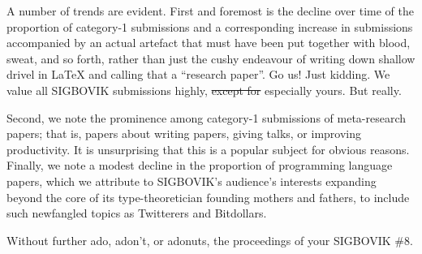 \documentclass[12pt]{article}
\begin{document}
A number of trends are evident. First and foremost is the decline over time of the proportion of category-1 submissions and a corresponding increase in submissions accompanied by an actual artefact that must have been put together with blood, sweat, and so forth, rather than just the cushy endeavour of writing down shallow drivel in LaTeX and calling that a ``research paper''. Go us! Just kidding. We value all SIGBOVIK submissions highly, \sout{except for} especially yours. But really.

Second, we note the prominence among category-1 submissions of meta-research papers; that is, papers about writing papers, giving talks, or improving productivity. It is unsurprising that this is a popular subject for obvious reasons. Finally, we note a modest decline in the proportion of programming language papers, which we attribute to SIGBOVIK's audience's interests expanding beyond the core of its type-theoretician founding mothers and fathers, to include such newfangled topics as Twitterers and Bitdollars.

Without further ado, adon't, or adonuts, the proceedings of your SIGBOVIK \#8.
\end{document}
